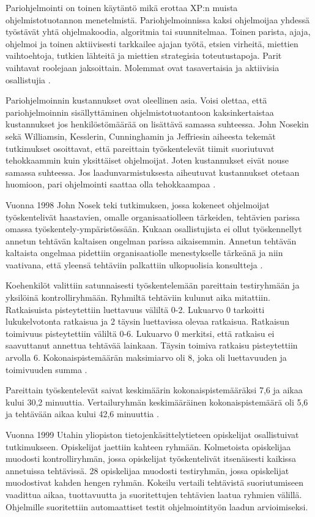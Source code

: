 \documentclass[finnish]{tktltiki2}
\theoremstyle{definition}
\theoremstyle{remark}
\begin{document}
{Pariohjelmointi on toinen käytäntö mikä erottaa XP:n muista ohjelmistotuotannon menetelmistä. Pariohjelmoinnissa kaksi ohjelmoijaa yhdessä työstävät yhtä ohjelmakoodia, algoritmia tai suunnitelmaa. Toinen parista, ajaja, ohjelmoi ja toinen aktiivisesti tarkkailee ajajan työtä, etsien virheitä, miettien vaihtoehtoja, tutkien lähteitä ja miettien strategisia toteutustapoja. Parit vaihtavat roolejaan jaksoittain. Molemmat ovat tasavertaisia ja aktiivisia osallistujia \cite{WIL00}.

Pariohjelmoinnin kustannukset ovat oleellinen asia. Voisi olettaa, että pariohjelmoinnin sisällyttäminen ohjelmistotuotantoon kaksinkertaistaa kustannukset jos henkilöstömäärää on lisättävä samassa suhteessa. John Nosekin \cite{NOS98} sekä Williamsin, Kesslerin, Cunninghamin ja Jeffriesin \cite{WIL00} aiheesta tekemät tutkimukset osoittavat, että pareittain työskentelevät tiimit suoriutuvat tehokkaammin kuin yksittäiset ohjelmoijat. Joten kustannukset eivät nouse samassa suhteessa. Jos laadunvarmistuksesta aiheutuvat kustannukset otetaan huomioon, pari ohjelmointi saattaa olla tehokkaampaa \cite{COC00a}.

Vuonna 1998 John Nosek teki tutkimuksen, jossa kokeneet ohjelmoijat työskentelivät haastavien, omalle organisaatiolleen tärkeiden, tehtävien parissa omassa työskentely-ympäristössään. Kukaan osallistujista ei ollut työskennellyt annetun tehtävän kaltaisen ongelman parissa aikaisemmin. Annetun tehtävän kaltaista ongelmaa pidettiin organisaatiolle menestykselle tärkeänä ja niin vaativana, että yleensä tehtäviin palkattiin ulkopuolisia konsultteja \cite{NOS98}.

Koehenkilöt valittiin satunnaisesti työskentelemään pareittain testiryhmään ja yksilöinä kontrolliryhmään.
Ryhmiltä tehtäviin kulunut aika mitattiin. Ratkaisuista pisteytettiin luettavuus väliltä 0-2. Lukuarvo 0 tarkoitti lukukelvotonta ratkaisua ja 2 täysin luettavissa olevaa ratkaisua. Ratkaisun toimivuus pisteytettiin väliltä 0-6. Lukuarvo 0 merkitsi, että ratkaisu ei saavuttanut annettua tehtävää lainkaan. Täysin toimiva ratkaisu pisteytettiin arvolla 6. Kokonaispistemäärän maksimiarvo oli 8, joka oli luettavuuden ja toimivuuden summa \cite{NOS98}.

Pareittain työskentelevät saivat keskimäärin kokonaispistemääräksi 7,6 ja aikaa kului 30,2 minuuttia. Vertailuryhmän keskimääräinen kokonaispistemäärä oli 5,6 ja tehtävään aikaa kului 42,6 minuuttia \cite{NOS98}.

Vuonna 1999 Utahin yliopiston tietojenkäsittelytieteen opiskelijat osallistuivat tutkimukseen. Opiskelijat jaettiin kahteen ryhmään. Kolmetoista opiskelijaa muodosti kontrolliryhmän, jossa opiskelijat työskentelivät itsenäisesti kaikissa annetuissa tehtävissä. 28 opiskelijaa muodosti testiryhmän, jossa opiskelijat muodostivat kahden hengen ryhmän. Kokeilu vertaili tehtävistä suoriutumiseen vaadittua aikaa, tuottavuutta ja suoritettujen tehtävien laatua ryhmien välillä. Ohjelmille suoritettiin automaattiset testit ohjelmointityön laadun arvioimiseksi\cite{WIL00}.

}
\end{document}
